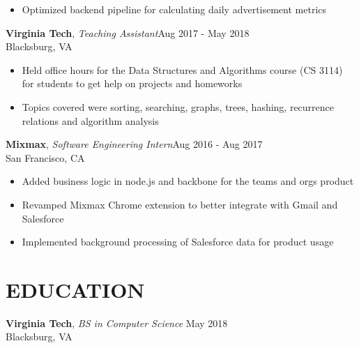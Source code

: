 \documentclass[line,margin]{res}
\begin{document}
\begin{resume}
\begin{itemize}
			\item Optimized backend pipeline for calculating daily advertisement metrics 
		\end{itemize}
		\textbf{Virginia Tech}, {\sl Teaching Assistant}\hfill Aug 2017 - May 2018\\Blacksburg, VA\\
		\begin{itemize} \itemsep 1pt
		\item Held office hours for the Data Structures and Algorithms course (CS 3114) for students
			  to get help on projects and homeworks
		\item Topics covered were sorting, searching, graphs, trees, hashing, recurrence relations and algorithm analysis
		\end{itemize}

		\textbf{Mixmax}, {\sl Software Engineering Intern}\hfill Aug 2016 - Aug 2017\\San Francisco, CA\\
		\begin{itemize} \itemsep 1pt
			\item Added business logic in node.js and backbone for the teams and orgs product
			\item Revamped Mixmax Chrome extension to better integrate with Gmail and Salesforce
			\item Implemented background processing of Salesforce data for product usage
		\end{itemize}

	\section{EDUCATION}
		\textbf{Virginia Tech}, {\sl BS in Computer Science} \hfill May 2018\\Blacksburg, VA

\end{resume}
\end{document}
